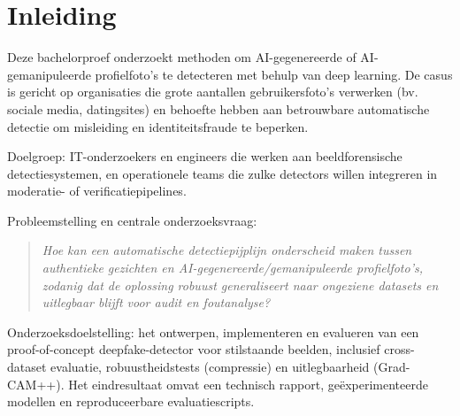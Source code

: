 


% 

\section{Inleiding}%
\label{sec:inleiding}
Deze bachelorproef onderzoekt methoden om AI-gegenereerde of AI-gemanipuleerde profielfoto's te detecteren met behulp van deep learning. De casus is gericht op organisaties die grote aantallen gebruikersfoto's verwerken (bv. sociale media, datingsites) en behoefte hebben aan betrouwbare automatische detectie om misleiding en identiteitsfraude te beperken.

Doelgroep: IT-onderzoekers en engineers die werken aan beeldforensische detectiesystemen, en operationele teams die zulke detectors willen integreren in moderatie- of verificatiepipelines.

Probleemstelling en centrale onderzoeksvraag:
\begin{quote}
\textit{Hoe kan een automatische detectiepijplijn onderscheid maken tussen authentieke gezichten en AI-gegenereerde/gemanipuleerde profielfoto's, zodanig dat de oplossing robuust generaliseert naar ongeziene datasets en uitlegbaar blijft voor audit en foutanalyse?}
\end{quote}

Onderzoeksdoelstelling: het ontwerpen, implementeren en evalueren van een proof-of-concept deepfake-detector voor stilstaande beelden, inclusief cross-dataset evaluatie, robuustheidstests (compressie) en uitlegbaarheid (Grad-CAM++). Het eindresultaat omvat een technisch rapport, geëxperimenteerde modellen en reproduceerbare evaluatiescripts.


